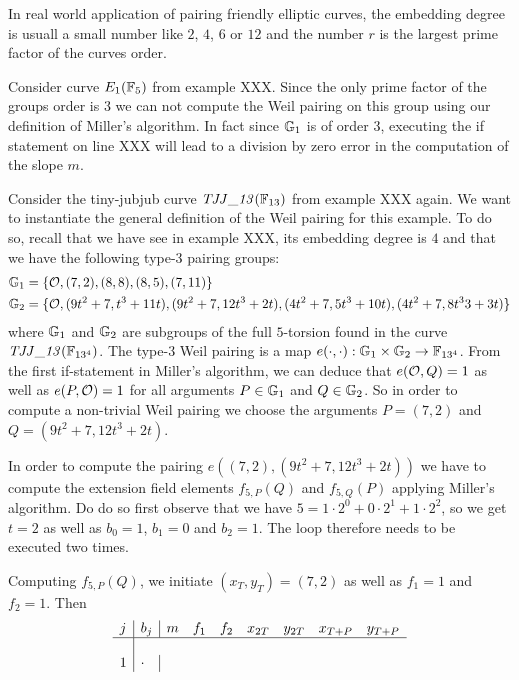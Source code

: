 In real world application of pairing friendly elliptic curves, the embedding degree is usuall a small number like $2$, $4$, $6$ or $12$ and the number $r$ is the largest prime factor of the curves order.
\begin{example}Consider curve $E_1(\mathbb{F}_5)$ from example XXX. Since the only prime factor of the groups order is $3$ we can not compute the Weil pairing on this group using our definition of Miller's algorithm. In fact since $\mathbb{G}_1$ is of order $3$, executing the if statement on line XXX will lead to a division by zero error in the computation of the slope $m$.
\end{example}
\begin{example} Consider the tiny-jubjub curve $\mathit{TJJ\_13}(\mathbb{F}_{13})$ from example XXX again. We want to instantiate the general definition of the Weil pairing for this example. To do so, recall that we have see in example XXX, its embedding degree is $4$ and that we have the following type-3 pairing groups:
\begin{align*}
\mathbb{G}_1 & = \{\mathcal{O}, (7,2), (8,8), (8,5), (7,11)\}\\
\mathbb{G}_2 & = \{\mathcal{O}, (9t^2 + 7,t^3 + 11t), (9t^2 + 7, 12t^3 + 2t),
(4t^2 + 7, 5t^3 + 10t), (4t^2 + 7, 8t^33 + 3t)\}
\end{align*}
where $\mathbb{G}_1$ and $\mathbb{G}_2$ are subgroups of the full $5$-torsion found in the curve $\mathit{TJJ\_13}(\mathbb{F}_{13^4})$. The type-3 Weil pairing is a map $e(\cdot,\cdot): \mathbb{G}_1 \times \mathbb{G}_2 \to \mathbb{F}_{13^4}$. From the first if-statement in Miller's algorithm, we can deduce that
$e(\mathcal{O},Q)=1$ as well as $e(P,\mathcal{O})=1$ for all arguments $P\in\mathbb{G}_1$ and $Q\in \mathbb{G}_2$. So in order to compute a non-trivial Weil pairing we choose the arguments
$P=(7,2)$ and $Q=(9t^2 + 7, 12t^3 + 2t)$.

In order to compute the pairing $e((7,2),(9t^2 + 7, 12t^3 + 2t))$ we have to compute the extension field elements $f_{5,P}(Q)$ and $f_{5,Q}(P)$ applying Miller's algorithm. Do do so first observe that we have $5 = 1\cdot 2^0 + 0 \cdot 2^1 + 1\cdot 2^2$, so we get $t=2$ as well as $b_0=1$, $b_1=0$ and $b_2=1$. The loop therefore needs to be executed two times.

Computing $f_{5,P}(Q)$, we initiate $(x_T,y_T) = (7,2)$ as well as $f_1=1$ and $f_2=1$. Then
$$
\begin{array}{l|l|lllllll}
j & b_j & m & f_1 & f_2 & x_{2T} & y_{2T} & x_{T+P} & y_{T+P}\\
\hline\\
1 & \cdot &
\end{array}
$$


\end{example}
